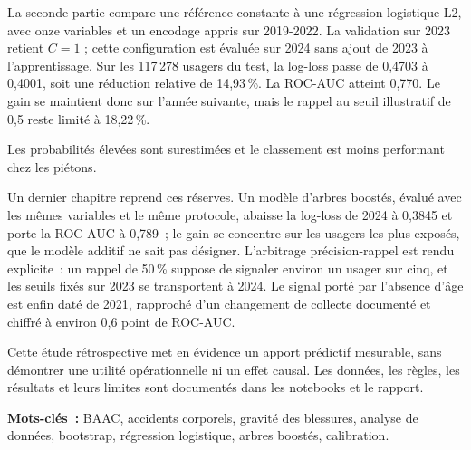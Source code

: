 La seconde partie compare une référence constante à une régression logistique L2,
avec onze variables et un encodage appris sur 2019-2022. La validation sur 2023 retient
$C=1$ ; cette configuration est évaluée sur 2024 sans ajout de 2023 à l'apprentissage.
Sur les 117\,278 usagers du test, la log-loss passe de 0,4703 à 0,4001, soit une réduction
relative de 14,93\,\%. La ROC-AUC atteint 0,770. Le gain se maintient donc sur l'année
suivante, mais le rappel au seuil illustratif de 0,5 reste limité à 18,22\,\%.

Les probabilités élevées sont surestimées et le classement est moins performant chez
les piétons.

Un dernier chapitre reprend ces réserves. Un modèle d'arbres boostés, évalué avec les
mêmes variables et le même protocole, abaisse la log-loss de 2024 à 0,3845 et porte la
ROC-AUC à 0,789~; le gain se concentre sur les usagers les plus exposés, que le modèle
additif ne sait pas désigner. L'arbitrage précision-rappel est rendu explicite~: un
rappel de 50\,\% suppose de signaler environ un usager sur cinq, et les seuils fixés
sur 2023 se transportent à 2024. Le signal porté par l'absence d'âge est enfin daté de
2021, rapproché d'un changement de collecte documenté et chiffré à environ 0,6 point
de ROC-AUC.

Cette étude rétrospective met en évidence un apport prédictif mesurable, sans démontrer
une utilité opérationnelle ni un effet causal. Les données, les règles, les résultats
et leurs limites sont documentés dans les notebooks et le rapport.

\vspace{3mm}
{\sffamily\small\raggedright\textbf{Mots-clés~:} BAAC, accidents corporels, gravité des blessures,
analyse de données, bootstrap, régression logistique, arbres boostés, calibration.\par}
